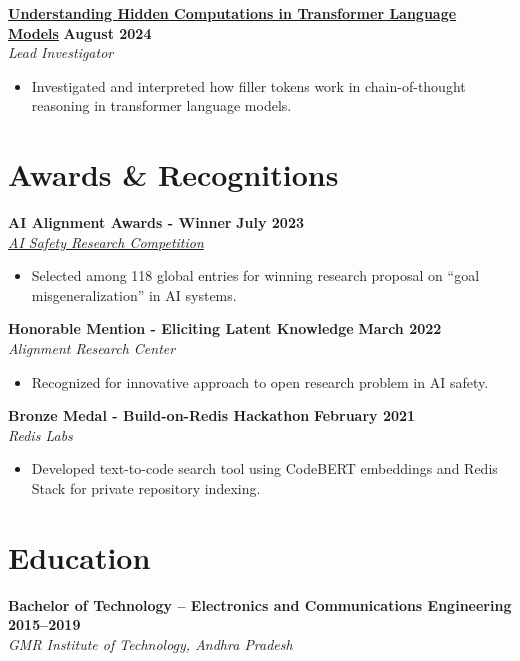 \documentclass[11pt]{article}
\newcommand{\entrygap}{\vspace{8pt}}
\begin{document}
\entrygap
\textbf{\href{https://arxiv.org/abs/2412.04537}{Understanding Hidden Computations in Transformer Language Models}} \hfill \textbf{August 2024} \\
\textit{Lead Investigator}
\begin{itemize}[leftmargin=*, nosep]
\item Investigated and interpreted how filler tokens work in chain-of-thought reasoning in transformer language models.
\end{itemize}

\section{Awards \& Recognitions}

\textbf{AI Alignment Awards - Winner} \hfill \textbf{July 2023} \\
\textit{\href{https://www.lesswrong.com/posts/zFoAAD7dfWdczxoLH/winners-of-ai-alignment-awards-research-contest}{AI Safety Research Competition}}
\begin{itemize}[leftmargin=*, nosep]
\item Selected among 118 global entries for winning research proposal on ``goal misgeneralization'' in AI systems.
\end{itemize}

\entrygap
\textbf{Honorable Mention - Eliciting Latent Knowledge} \hfill \textbf{March 2022} \\
\textit{Alignment Research Center}
\begin{itemize}[leftmargin=*, nosep]
\item Recognized for innovative approach to open research problem in AI safety.
\end{itemize}

\entrygap
\textbf{Bronze Medal - Build-on-Redis Hackathon} \hfill \textbf{February 2021} \\
\textit{Redis Labs}
\begin{itemize}[leftmargin=*, nosep]
\item Developed text-to-code search tool using CodeBERT embeddings and Redis Stack for private repository indexing.
\end{itemize}

\section{Education}

\textbf{Bachelor of Technology -- Electronics and Communications Engineering} \hfill \textbf{2015--2019} \\
\textit{GMR Institute of Technology, Andhra Pradesh}
\end{document}
